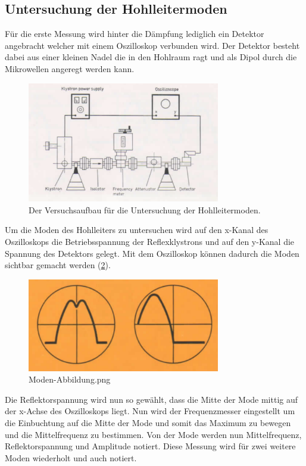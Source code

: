     \subsection{Untersuchung der Hohlleitermoden}
        Für die erste Messung wird hinter die Dämpfung lediglich ein Detektor angebracht welcher mit einem Oszilloskop verbunden wird.
        Der Detektor besteht dabei aus einer kleinen Nadel die in den Hohlraum ragt und als Dipol durch die Mikrowellen angeregt werden kann.
        \begin{figure}[H]
            \centering
            \includegraphics[width = 0.75\textwidth]{bilder/Aufbau_Teil1.png}
            \caption{Der Versuchsaufbau für die Untersuchung der Hohlleitermoden.}
            \label{fig:Teil1}
        \end{figure}
        Um die Moden des Hohlleiters zu untersuchen wird auf den x-Kanal des Oszilloskops die Betriebsspannung der Reflexklystrons und auf den y-Kanal die Spannung des Detektors gelegt.
        Mit dem Oszilloskop können dadurch die Moden sichtbar gemacht werden (\ref{fig:Moden-Abbildung}).
        \begin{figure}[H]
            \centering
            \includegraphics[width = 0.75\textwidth]{bilder/Moden-Abbildung.png}
            \caption{Moden-Abbildung.png}
            \label{fig:Moden-Abbildung}
        \end{figure}
        Die Reflektorspannung wird nun so gewählt, dass die Mitte der Mode mittig auf der x-Achse des Oszilloskops liegt.
        Nun wird der Frequenzmesser eingestellt um die Einbuchtung auf die Mitte der Mode und somit das Maximum zu bewegen und die Mittelfrequenz zu bestimmen.
        Von der Mode werden nun Mittelfrequenz, Reflektorspannung und Amplitude notiert.
        Diese Messung wird für zwei weitere Moden wiederholt und auch notiert.

